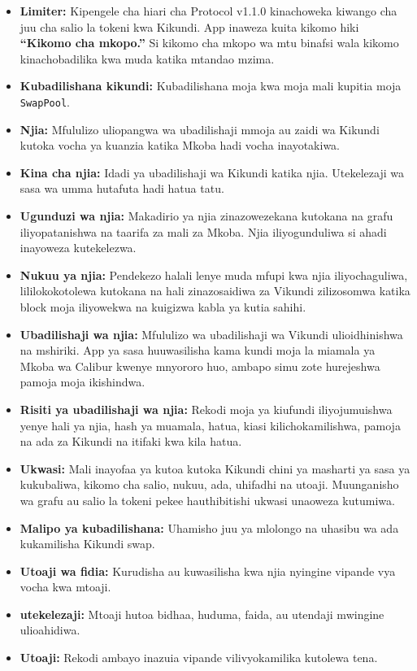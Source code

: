 \documentclass[11pt]{article}
\begin{document}
\begin{itemize}[leftmargin=*]
\item \textbf{Limiter:} Kipengele cha hiari cha Protocol v1.1.0 kinachoweka kiwango cha juu cha salio la tokeni kwa Kikundi. App inaweza kuita kikomo hiki \textbf{``Kikomo cha mkopo.''} Si kikomo cha mkopo wa mtu binafsi wala kikomo kinachobadilika kwa muda katika mtandao mzima.
\item \textbf{Kubadilishana kikundi:} Kubadilishana moja kwa moja mali kupitia moja \texttt{SwapPool}.
\item \textbf{Njia:} Mfululizo uliopangwa wa ubadilishaji mmoja au zaidi wa Kikundi kutoka vocha ya kuanzia katika Mkoba hadi vocha inayotakiwa.
\item \textbf{Kina cha njia:} Idadi ya ubadilishaji wa Kikundi katika njia. Utekelezaji wa sasa wa umma hutafuta hadi hatua tatu.
\item \textbf{Ugunduzi wa njia:} Makadirio ya njia zinazowezekana kutokana na grafu iliyopatanishwa na taarifa za mali za Mkoba. Njia iliyogunduliwa si ahadi inayoweza kutekelezwa.
\item \textbf{Nukuu ya njia:} Pendekezo halali lenye muda mfupi kwa njia iliyochaguliwa, lililokokotolewa kutokana na hali zinazosaidiwa za Vikundi zilizosomwa katika block moja iliyowekwa na kuigizwa kabla ya kutia sahihi.
\item \textbf{Ubadilishaji wa njia:} Mfululizo wa ubadilishaji wa Vikundi ulioidhinishwa na mshiriki. App ya sasa huuwasilisha kama kundi moja la miamala ya Mkoba wa Calibur kwenye mnyororo huo, ambapo simu zote hurejeshwa pamoja moja ikishindwa.
\item \textbf{Risiti ya ubadilishaji wa njia:} Rekodi moja ya kiufundi iliyojumuishwa yenye hali ya njia, hash ya muamala, hatua, kiasi kilichokamilishwa, pamoja na ada za Kikundi na itifaki kwa kila hatua.
\item \textbf{Ukwasi:} Mali inayofaa ya kutoa kutoka Kikundi chini ya masharti ya sasa ya kukubaliwa, kikomo cha salio, nukuu, ada, uhifadhi na utoaji. Muunganisho wa grafu au salio la tokeni pekee hauthibitishi ukwasi unaoweza kutumiwa.
\item \textbf{Malipo ya kubadilishana:} Uhamisho juu ya mlolongo na uhasibu wa ada kukamilisha Kikundi swap.
\item \textbf{Utoaji wa fidia:} Kurudisha au kuwasilisha kwa njia nyingine vipande vya vocha kwa mtoaji.
\item \textbf{utekelezaji:} Mtoaji hutoa bidhaa, huduma, faida, au utendaji mwingine ulioahidiwa.
\item \textbf{Utoaji:} Rekodi ambayo inazuia vipande vilivyokamilika kutolewa tena.

\end{itemize}
\end{document}
